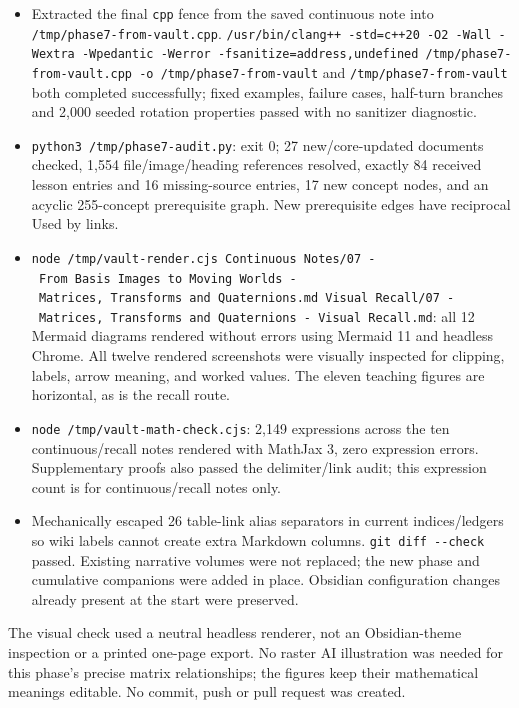 \begin{itemize}
\tightlist
\item
  Extracted the final \texttt{cpp} fence from the saved continuous note into \texttt{/tmp/phase7-from-vault.cpp}. \texttt{/usr/bin/clang++\ -std=c++20\ -O2\ -Wall\ -Wextra\ -Wpedantic\ -Werror\ -fsanitize=address,undefined\ /tmp/phase7-from-vault.cpp\ -o\ /tmp/phase7-from-vault} and \texttt{/tmp/phase7-from-vault} both completed successfully; fixed examples, failure cases, half-turn branches and 2,000 seeded rotation properties passed with no sanitizer diagnostic.
\item
  \texttt{python3\ /tmp/phase7-audit.py}: exit 0; 27 new/core-updated documents checked, 1,554 file/image/heading references resolved, exactly 84 received lesson entries and 16 missing-source entries, 17 new concept nodes, and an acyclic 255-concept prerequisite graph. New prerequisite edges have reciprocal Used by links.
\item
  \texttt{node\ /tmp/vault-render.cjs\ \textquotesingle{}Continuous\ Notes/07\ -\ From\ Basis\ Images\ to\ Moving\ Worlds\ -\ Matrices,\ Transforms\ and\ Quaternions.md\textquotesingle{}\ \textquotesingle{}Visual\ Recall/07\ -\ Matrices,\ Transforms\ and\ Quaternions\ -\ Visual\ Recall.md\textquotesingle{}}: all 12 Mermaid diagrams rendered without errors using Mermaid 11 and headless Chrome. All twelve rendered screenshots were visually inspected for clipping, labels, arrow meaning, and worked values. The eleven teaching figures are horizontal, as is the recall route.
\item
  \texttt{node\ /tmp/vault-math-check.cjs}: 2,149 expressions across the ten continuous/recall notes rendered with MathJax 3, zero expression errors. Supplementary proofs also passed the delimiter/link audit; this expression count is for continuous/recall notes only.
\item
  Mechanically escaped 26 table-link alias separators in current indices/ledgers so wiki labels cannot create extra Markdown columns. \texttt{git\ diff\ -\/-check} passed. Existing narrative volumes were not replaced; the new phase and cumulative companions were added in place. Obsidian configuration changes already present at the start were preserved.
\end{itemize}

The visual check used a neutral headless renderer, not an Obsidian-theme inspection or a printed one-page export. No raster AI illustration was needed for this phase's precise matrix relationships; the figures keep their mathematical meanings editable. No commit, push or pull request was created.

